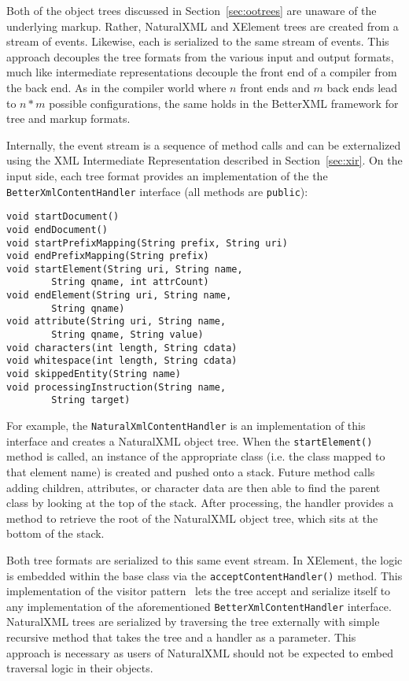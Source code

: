 Both of the object trees discussed in Section~\ref{sec:ootrees} are
unaware of the underlying markup.  Rather, NaturalXML and XElement
trees are created from a stream of events.  Likewise, each is
serialized to the same stream of events.  This approach decouples the
tree formats from the various input and output formats, much like
intermediate representations decouple the front end of a compiler from
the back end. As in the compiler world where $n$ front ends and $m$
back ends lead to $n*m$ possible configurations, the same holds in the
BetterXML framework for tree and markup formats.


Internally, the event stream is a sequence of method calls and can be
externalized using the XML Intermediate Representation described in
Section~\ref{sec:xir}.  On the input side, each tree format provides
an implementation of the the \lstinline{BetterXmlContentHandler}
interface (all methods are \lstinline{public}):

\begin{lstlisting}
void startDocument()
void endDocument()
void startPrefixMapping(String prefix, String uri)
void endPrefixMapping(String prefix)
void startElement(String uri, String name, 
        String qname, int attrCount)
void endElement(String uri, String name, 
        String qname)
void attribute(String uri, String name, 
        String qname, String value)
void characters(int length, String cdata)
void whitespace(int length, String cdata)
void skippedEntity(String name)
void processingInstruction(String name, 
        String target)
\end{lstlisting}

For example, the \lstinline'NaturalXmlContentHandler' is an
implementation of this interface and creates a NaturalXML object tree.
When the \lstinline'startElement()' method is called, an instance of
the appropriate class (i.e. the class mapped to that element name) is
created and pushed onto a stack.  Future method calls adding children,
attributes, or character data are then able to find the parent class
by looking at the top of the stack.  After processing, the handler
provides a method to retrieve the root of the NaturalXML object tree,
which sits at the bottom of the stack.

Both tree formats are serialized to this same event stream.  In
XElement, the logic is embedded within the base class via the
\lstinline{acceptContentHandler()} method.  This implementation of the
visitor pattern~\cite{gangOf4} lets the tree accept and
serialize itself to any implementation of the aforementioned
\lstinline{BetterXmlContentHandler} interface.  NaturalXML trees are
serialized by traversing the tree externally with simple recursive method
that takes the tree and a handler as a parameter.  This approach is necessary as
users of NaturalXML should not be expected to embed traversal logic in
their objects.

